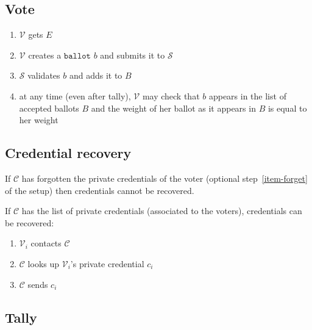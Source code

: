 \documentclass[a4paper]{article}
\newcommand{\ballot}{\texttt{ballot}}
\begin{document}
\subsection{Vote}

\begin{enumerate}
\item $\mathcal{V}$ gets $E$
\item $\mathcal{V}$ creates a \hyperref[ballots]{$\ballot$} $b$ and submits it to $\mathcal{S}$
\item $\mathcal{S}$ validates $b$ and adds it to $B$
\item at any time (even after tally), $\mathcal{V}$ may check that $b$
  appears in the list of accepted ballots $B$ and the weight of her
  ballot as it appears in $B$ is equal to her weight
\end{enumerate}


\subsection{Credential recovery}

If $\mathcal C$ has forgotten the private credentials of the voter
(optional step~\ref{item-forget} of the setup) then credentials cannot
be recovered.

If $\mathcal C$ has the list of private credentials (associated to the
voters), credentials can be recovered:
\begin{enumerate}
\item $\mathcal{V}_i$ contacts $\mathcal{C}$
\item $\mathcal{C}$ looks up $\mathcal{V}_i$'s private credential $c_i$
\item $\mathcal{C}$ sends $c_i$
\end{enumerate}

\subsection{Tally}
\end{document}

